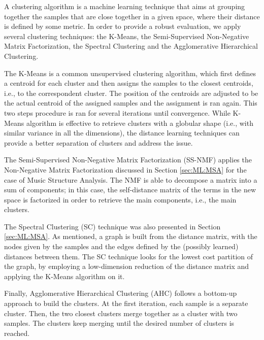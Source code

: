 A clustering algorithm is a machine learning technique that aims at grouping together the samples that are close together in a given space, where their distance is defined by some metric. In order to provide a robust evaluation, we apply several clustering techniques: the K-Means, the Semi-Supervised Non-Negative Matrix Factorization, the Spectral Clustering and the Agglomerative Hierarchical Clustering.

The K-Means \cite{macqueen1967some} is a common unsupervised clustering algorithm, which first defines a centroid for each cluster and then assigns the samples to the closest centroids, i.e., to the correspondent cluster. The position of the centroids are adjusted to be the actual centroid of the assigned samples and the assignment is ran again. This two steps procedure is ran for several iterations until convergence. While K-Means algorithm is effective to retrieve clusters with a globular shape \cite{PAMI} (i.e., with similar variance in all the dimensions), the distance learning techniques can provide a better separation of clusters and address the issue.

The Semi-Supervised Non-Negative Matrix Factorization \cite{chen2008} (SS-NMF) applies the Non-Negative Matrix Factorization discussed in Section \ref{sec:ML:MSA} for the case of Music Structure Analysis. The NMF is able to decompose a matrix into a sum of components; in this case, the self-distance matrix of the terms in the new space is factorized in order to retrieve the main components, i.e., the main clusters. 

The Spectral Clustering \cite{shi2000normalized} (SC) technique was also presented in Section \ref{sec:ML:MSA}. As mentioned, a graph is built from the distance matrix, with the nodes given by the samples and the edges defined by the (possibly learned) distances between them. The SC technique looks for the lowest cost partition of the graph, by employing a low-dimension reduction of the distance matrix and applying the K-Means algorithm on it.

Finally, Agglomerative Hierarchical Clustering \cite{sibson1973slink} (AHC) follows a bottom-up approach to build the clusters. At the first iteration, each sample is a separate cluster. Then, the two closest clusters merge together as a cluster with two samples. The clusters keep merging until the desired number of clusters is reached. 

